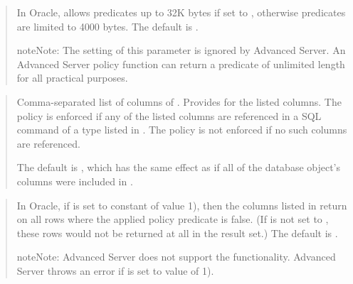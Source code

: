 \documentclass[letterpaper,10pt,english,openany,oneside]{sphinxmanual}
\begin{document}
\begin{quote}

In Oracle, allows predicates up to 32K bytes if set to , otherwise
predicates are limited to 4000 bytes. The default is .

\begin{sphinxadmonition}{note}{Note:}
The setting of this parameter is ignored by Advanced Server. An Advanced Server policy function can return a predicate of unlimited length for all practical purposes.
\end{sphinxadmonition}
\end{quote}

\begin{quote}

Comma-separated list of columns of . Provides
 for the listed columns. The
policy is enforced if any of the listed columns are referenced in a SQL
command of a type listed in . The policy is not
enforced if no such columns are referenced.

The default is , which has the same effect as if all of the database
object’s columns were included in .
\end{quote}

\begin{quote}

In Oracle, if  is set to  constant of value 1), then the columns listed in
 return  on all rows where the applied policy
predicate is false. (If  is not set to
, these rows would not be returned at all in the
result set.) The default is .

\begin{sphinxadmonition}{note}{Note:}
Advanced Server does not support the  functionality. Advanced Server throws an error if  is set to  value of 1).
\end{sphinxadmonition}
\end{quote}
\end{document}
